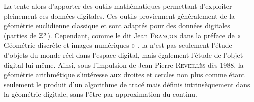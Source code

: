 La  tente alors d'apporter des outils mathématiques
permettant d'exploiter pleinement ces données digitales. Ces outils proviennent
généralement de la géométrie euclidienne classique et sont adaptés pour des
données digitales (parties de $\mathbb{Z}^d$). Cependant, comme le dit Jean
\textsc{Françon} dans la préface de « Géométrie discrète et images numériques »
\cite{Coeurjolly2007Book}, la \DigitalGeometry n'est pas seulement l'étude
d'objets du monde réel dans l'espace digital, mais également l'étude de l'objet
digital lui-même. Ainsi, sous l'impulsion de Jean-Pierre \textsc{Reveillès} dès
1988, la géométrie arithmétique s'intéresse aux droites et cercles non plus
comme étant seulement le produit d’un algorithme de tracé mais définis
intrinsèquement dans la géométrie digitale, sans l’être par approximation du
continu.

